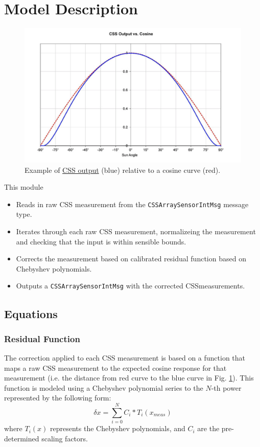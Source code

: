 
\section{Model Description}

\begin{figure}[H]
	\centerline{
		\includegraphics[scale=0.5]{Figures/CSSCalibration}
	}
	\caption{Example of \href{https://lang.adcole.com/aerospace/analog-sun-sensors/coarse-sun-sensor-detector/}{CSS output} (blue) relative to a cosine curve (red)\cite{CSS}.}
	\label{fig:CSSraw}
\end{figure}

This module 
\begin{itemize}
\item Reads in raw CSS measurement from the \verb.CSSArraySensorIntMsg. message type.
\item Iterates through each raw CSS measurement, normalizeing the measurement and checking that the input is within sensible bounds.
\item Corrects the measurement based on calibrated residual function based on Chebyshev polynomials. 
\item Outputs a \verb.CSSArraySensorIntMsg. with the corrected CSSmeasurements.
\end{itemize}


\subsection{Equations}
\subsubsection{Residual Function}
The correction applied to each CSS measurement is based on a function that maps a raw CSS measurement to the expected cosine response for that measurement (i.e. the distance from red curve to the blue curve in Fig. \ref{fig:CSSraw}). This function is modeled using a Chebyshev polynomial series to the $N$-th power represented by the following form: 
\begin{equation}
\delta x = \sum_{i=0}^{N} C_i*T_i(x_{meas})
\end{equation}
 where $T_i(x)$ represents the Chebyshev polynomials, and $C_i$ are the pre-determined scaling factors. 

